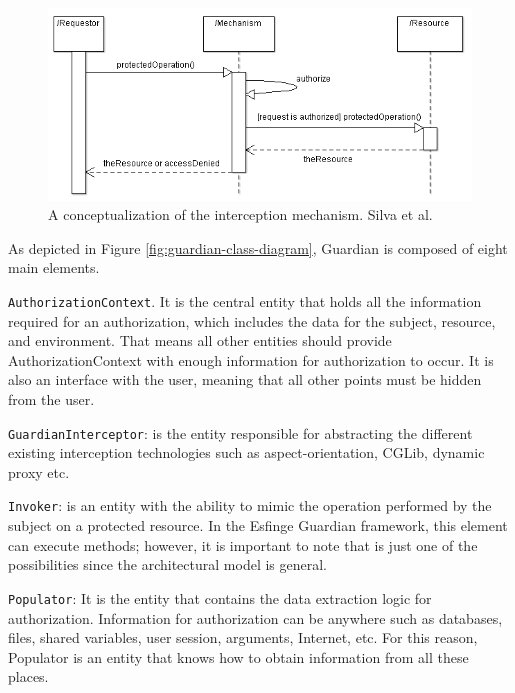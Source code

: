 \documentclass[sigconf]{acmart}
\begin{document}
\begin{figure}
  \centering
  \includegraphics[scale=0.5]{img/interception-mechanism.png}
  \caption{A conceptualization of the interception mechanism. Silva et al. \cite{Silva2013}}
  \label{fig:interception-mechanism}
\end{figure}


As depicted in Figure \ref{fig:guardian-class-diagram}, Guardian is composed of eight main elements.







\noindent \verb|AuthorizationContext|. It is the central entity that holds all the information required for an authorization, which includes the data for the subject, resource, and environment. That means all other entities should provide AuthorizationContext with enough information for authorization to occur. It is also an interface with the user, meaning that all other points must be hidden from the user.

\noindent \verb|GuardianInterceptor|: is the entity responsible for abstracting the different existing interception technologies such as \linebreak aspect-orientation, CGLib, dynamic proxy etc.


\noindent \verb|Invoker|: is an entity with the ability to mimic the operation performed by the subject on a protected resource. In the Esfinge \linebreak Guardian framework, this element can execute methods; however, it is important to note that is just one of the possibilities since the architectural model is general.


\noindent \verb|Populator|: It is the entity that contains the data extraction logic for authorization. Information for authorization can be anywhere such as databases, files, shared variables, user session, arguments, Internet, etc. For this reason, Populator is an entity that knows how to obtain information from all these places.
\end{document}
